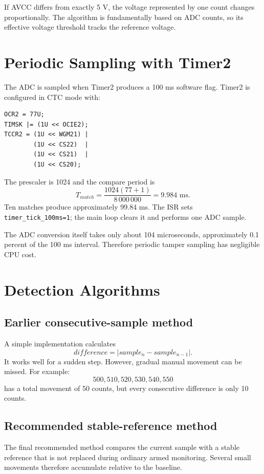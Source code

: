 \documentclass[11pt,a4paper]{article}
\begin{document}
If AVCC differs from exactly 5 V, the voltage represented by one count changes proportionally. The algorithm is fundamentally based on ADC counts, so its effective voltage threshold tracks the reference voltage.

\section{Periodic Sampling with Timer2}
The ADC is sampled when Timer2 produces a 100 ms software flag. Timer2 is configured in CTC mode with:
\begin{lstlisting}[style=cstyle]
OCR2 = 77U;
TIMSK |= (1U << OCIE2);
TCCR2 = (1U << WGM21) |
        (1U << CS22)  |
        (1U << CS21)  |
        (1U << CS20);
\end{lstlisting}
The prescaler is 1024 and the compare period is
\[
T_{match}=\frac{1024(77+1)}{8\,000\,000}=9.984\text{ ms}.
\]
Ten matches produce approximately 99.84 ms. The ISR sets \texttt{timer\_tick\_100ms=1}; the main loop clears it and performs one ADC sample.

The ADC conversion itself takes only about 104 microseconds, approximately 0.1 percent of the 100 ms interval. Therefore periodic tamper sampling has negligible CPU cost.

\section{Detection Algorithms}
\subsection{Earlier consecutive-sample method}
A simple implementation calculates
\[
difference=|sample_{n}-sample_{n-1}|.
\]
It works well for a sudden step. However, gradual manual movement can be missed. For example:
\[
500,510,520,530,540,550
\]
has a total movement of 50 counts, but every consecutive difference is only 10 counts.

\subsection{Recommended stable-reference method}
The final recommended method compares the current sample with a stable reference that is not replaced during ordinary armed monitoring. Several small movements therefore accumulate relative to the baseline.
\end{document}
